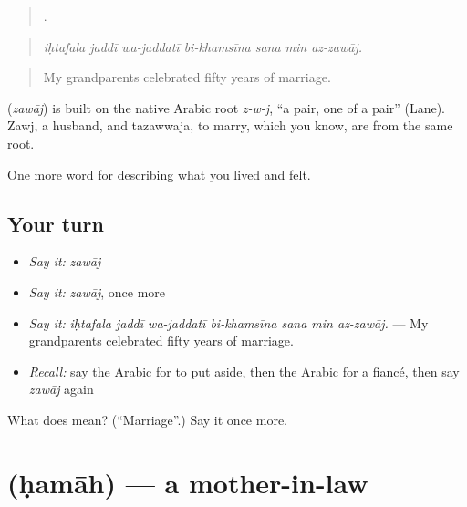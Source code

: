 \begin{quote}
      .
\end{quote}

\begin{quote}
\emph{iḥtafala jaddī wa-jaddatī bi-khamsīna sana min az-zawāj.}
\end{quote}

\begin{quote}
My grandparents celebrated fifty years of marriage.
\end{quote}

\begin{cousinweb}
\textbf{} (\emph{zawāj}) is built on the native Arabic root \emph{z-w-j}, \textquotedblleft{}a pair, one of a pair\textquotedblright{} (Lane). Zawj, a husband, and tazawwaja, to marry, which you know, are from the same root.
\end{cousinweb}

\begin{grammarlens}[title={What you've built}]
One more word for describing what you lived and felt.
\end{grammarlens}

\subsection*{Your turn}
\begin{itemize}
\raggedright
  \item \emph{Say it:} \emph{zawāj}
  \item \emph{Say it:} \emph{zawāj}, once more
  \item \emph{Say it:} \emph{iḥtafala jaddī wa-jaddatī bi-khamsīna sana min az-zawāj.} — My grandparents celebrated fifty years of marriage.
  \item \emph{Recall:} say the Arabic for to put aside, then the Arabic for a fiancé, then say \emph{zawāj} again
\end{itemize}

\begin{tcolorbox}[breakable,colback=teal!4,colframe=teal!35!black,title={Before you move on}]
What does  mean? (\textquotedblleft{}Marriage\textquotedblright{}.) Say it once more.
\end{tcolorbox}
\section[\texorpdfstring{\ar{حماة} (ḥamāh)}{حماة (ḥamāh)}]{ (ḥamāh) — a mother-in-law}


